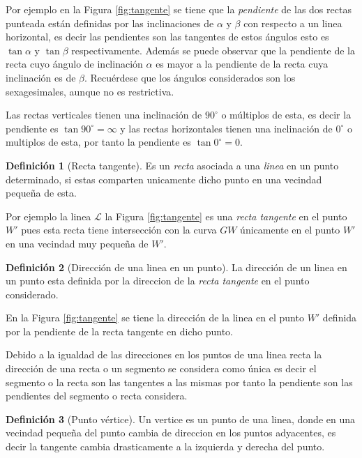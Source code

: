 \documentclass[
  16pt,
]{krantz}
\theoremstyle{definition}
\newtheorem{definition}{Definición}[chapter]
\theoremstyle{definition}
\theoremstyle{definition}
\theoremstyle{definition}
\theoremstyle{remark}
\begin{document}
Por ejemplo en la Figura \ref{fig:tangente} se tiene que la \emph{pendiente} de las dos rectas punteada están definidas por las inclinaciones de \(\alpha\) y \(\beta\) con respecto a un linea horizontal, es decir las pendientes son las tangentes de estos ángulos esto es \(\tan \alpha\) y \(\tan \beta\) respectivamente. Además se puede observar que la pendiente de la recta cuyo ángulo de inclinación \(\alpha\) es mayor a la pendiente de la recta cuya inclinación es de \(\beta\). Recuérdese que los ángulos considerados son los sexagesimales, aunque no es restrictiva.

Las rectas verticales tienen una inclinación de \(90^\circ\) o múltiplos de esta, es decir la pendiente es \(\tan 90^\circ=\infty\) y las rectas horizontales tienen una inclinación de \(0^\circ\) o multiplos de esta, por tanto la pendiente es \(\tan 0^\circ=0\).

\begin{definition}[Recta tangente]
\protect\hypertarget{def:tangentew}{}{\label{def:tangentew} {} }Es un \emph{recta} asociada a una \emph{linea} en un punto determinado, si estas comparten unicamente dicho punto en una vecindad pequeña de esta.
\end{definition}

Por ejemplo la linea \(\mathcal{L}\) la Figura \ref{fig:tangente} es una \emph{recta tangente} en el punto \(W'\) pues esta recta tiene intersección con la curva \(GW\) únicamente en el punto \(W'\) en una vecindad muy pequeña de \(W'\).

\begin{definition}[Dirección de una linea en un punto]
\protect\hypertarget{def:direccion}{}{\label{def:direccion} {} }La dirección de un linea en un punto esta definida por la direccion de la \emph{recta tangente} en el punto considerado.
\end{definition}

En la Figura \ref{fig:tangente} se tiene la dirección de la linea en el punto \(W'\) definida por la pendiente de la recta tangente en dicho punto.

Debido a la igualdad de las direcciones en los puntos de una linea recta la dirección de una recta o un segmento se considera como única es decir el segmento o la recta son las tangentes a las mismas por tanto la pendiente son las pendientes del segmento o recta considera.

\begin{definition}[Punto vértice]
\protect\hypertarget{def:puntovertice}{}{\label{def:puntovertice} {} }Un vertice es un punto de una linea, donde en una vecindad pequeña del punto cambia de direccion en los puntos adyacentes, es decir la tangente cambia drasticamente a la izquierda y derecha del punto.
\end{definition}
\end{document}
